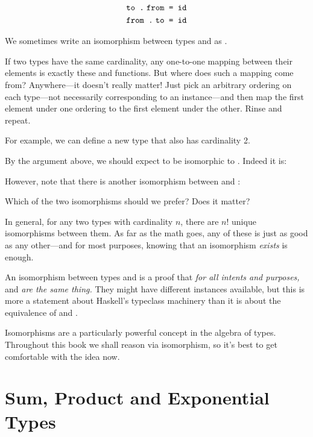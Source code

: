 \documentclass[book.tex]{subfiles}
\begin{document}
$$
\begin{align*}
  \texttt{to .\;{}from = id} \\
  \texttt{from .\;{}to = id} \\
\end{align*}
$$

We sometimes write an isomorphism between types  and  as .

If two types have the same cardinality, any one-to-one mapping between their
elements is exactly these  and  functions. But where does such a
mapping come from? Anywhere---it doesn't really matter! Just pick an arbitrary
ordering on each type---not necessarily corresponding to an 
instance---and then map the first element under one ordering to the first
element under the other. Rinse and repeat.

For example, we can define a new type that also has cardinality 2.


By the argument above, we should expect  to be isomorphic to .
Indeed it is:


However, note that there is another isomorphism between  and
:


Which of the two isomorphisms should we prefer? Does it matter?

In general, for any two types with cardinality $n$, there
are $n!$ unique isomorphisms between them. As far as the math goes, any of these
is just as good as any other---and for most purposes, knowing that an
isomorphism \emph{exists} is enough.

An isomorphism between types  and  is a proof that \emph{for all
intents and purposes,}  and  \emph{are the same thing.} They might
have different instances available, but this is more a statement about Haskell's
typeclass machinery than it is about the equivalence of  and .

Isomorphisms are a particularly powerful concept in the algebra of types.
Throughout this book we shall reason via isomorphism, so it's best to get
comfortable with the idea now.


\section{Sum, Product and Exponential Types}
\end{document}
